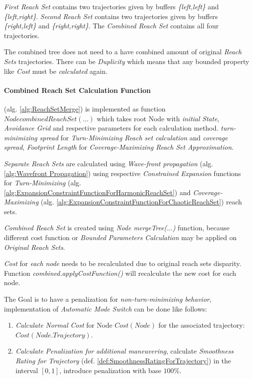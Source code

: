 \noindent\emph{First Reach Set} contains two trajectories given by buffers \emph{\{left,left\}} and \emph{\{left,right\}}. \emph{Second Reach Set} contains two trajectories given by buffers \emph{\{right,left\}} and \emph{\{right,right\}}. The \emph{Combined Reach Set} contains all four trajectories.

\begin{note}
    The combined tree \cite{o1996log} does not need to a have combined amount of original \emph{Reach Sets} trajectories. There can be \emph{Duplicity} which means that any bounded property like \emph{Cost} must be \emph{calculated} again.
\end{note}

\paragraph{Combined Reach Set Calculation Function} (alg. \ref{alg:ReachSetMerge}) is implemented as function $Node combinedReachSet(\dots)$ which takes root Node with \emph{initial State}, \emph{Avoidance Grid} and respective parameters for each calculation method. \emph{turn-minimizing spread} for \emph{Turn-Minimizing Reach set calculation} and \emph{coverage spread}, \emph{Footprint Length} for \emph{Coverage-Maximizing Reach Set Approximation}.

\emph{Separate Reach Sets} are calculated using \emph{Wave-front propagation} (alg. \ref{alg:Wavefront Propagation}) using respective \emph{Constrained Expansion} functions for \emph{Turn-Minimizing} (alg. \ref{alg:ExpansionConstraintFunctionForHarmonicReachSet}) and \emph{Coverage-Maximizing} (alg. \ref{alg:ExpansionConstraintFunctionForChaoticReachSet}) reach sets.

\emph{Combined Reach Set} is created using \emph{Node mergeTree($\dots$)} function, because different cost function or \emph{Bounded Parameters Calculation} may be applied on \emph{Original Reach Sets}.

\emph{Cost} for \emph{each node} needs to be recalculated due to original reach sets disparity. Function \emph{combined.applyCostFunction()} will recalculate the new cost for each node. 

The Goal is to have a penalization for \emph{non-turn-minimizing behavior}, implementation of \emph{Automatic Mode Switch} can be done like follows:
\begin{enumerate}
    \item \emph{Calculate Normal Cost} for Node $Cost(Node)$ for the associated trajectory:\\ $Cost(Node.Trajectory)$.
    
    \item \emph{Calculate Penalization for \emph{additional maneuvering}}, calculate \emph{Smoothness Rating for Trajectory} (def. \ref{def:SmoothnessRatingForTrajectory}) in the interval $[0,1]$, introduce penalization with base $100 \%$.
\end{enumerate}

